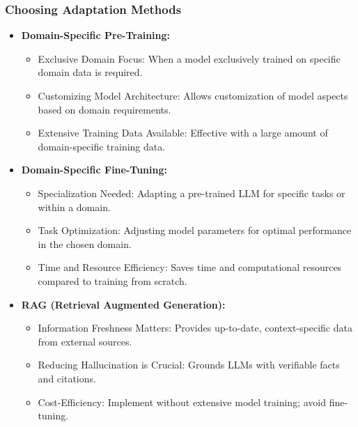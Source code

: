 \begin{frame}[fragile]\frametitle{Choosing Adaptation Methods}
  \begin{itemize}
    \item \textbf{Domain-Specific Pre-Training:}
      \begin{itemize}
        \item Exclusive Domain Focus: When a model exclusively trained on specific domain data is required.
        \item Customizing Model Architecture: Allows customization of model aspects based on domain requirements.
        \item Extensive Training Data Available: Effective with a large amount of domain-specific training data.
      \end{itemize}
    \item \textbf{Domain-Specific Fine-Tuning:}
      \begin{itemize}
        \item Specialization Needed: Adapting a pre-trained LLM for specific tasks or within a domain.
        \item Task Optimization: Adjusting model parameters for optimal performance in the chosen domain.
        \item Time and Resource Efficiency: Saves time and computational resources compared to training from scratch.
      \end{itemize}
    \item \textbf{RAG (Retrieval Augmented Generation):}
      \begin{itemize}
        \item Information Freshness Matters: Provides up-to-date, context-specific data from external sources.
        \item Reducing Hallucination is Crucial: Grounds LLMs with verifiable facts and citations.
        \item Cost-Efficiency: Implement without extensive model training; avoid fine-tuning.
      \end{itemize}
  \end{itemize}
\end{frame}
